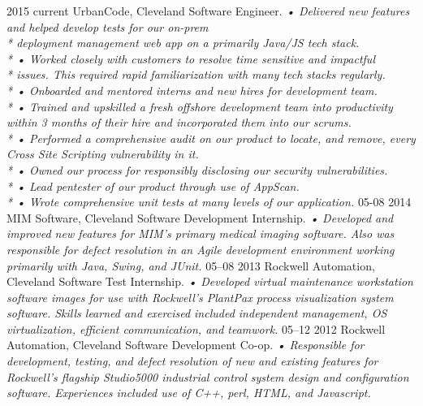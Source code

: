 \documentclass[]{friggeri-cv}
\begin{document}
\begin{entrylist}
  \entry
    {2015 current}
    {UrbanCode, Cleveland}
    {Software Engineer.}
    {\emph{
    •	Delivered new features and helped develop tests for our on-prem \\* deployment management web app on a primarily Java/JS tech stack.\\*
    •	Worked closely with customers to resolve time sensitive and impactful\\* issues. This required rapid familiarization with many tech stacks regularly.\\*
    •	Onboarded and mentored interns and new hires for development team. \\*
    •	Trained and upskilled a fresh offshore development team into productivity within 3 months of their hire and incorporated them into our scrums. \\*
    •	Performed a comprehensive audit on our product to locate, and remove, every Cross Site Scripting vulnerability in it.\\*
    •	Owned our process for responsibly disclosing our security vulnerabilities.\\*
    •	Lead pentester of our product through use of AppScan. \\*
    •	Wrote comprehensive unit tests at many levels of our application.
}}
  \entry
    {05-08 2014}
    {MIM Software, Cleveland}
    {Software Development Internship.}
    {\emph{
    •	Developed and improved new features for MIM's primary medical imaging software. Also was responsible for defect resolution in an Agile development environment working primarily with Java, Swing, and JUnit.}}
  \entry
    {05–08 2013}
    {Rockwell Automation, Cleveland}
    {Software Test Internship.}
    {\emph{
    •	Developed virtual maintenance workstation software images for use with Rockwell’s PlantPax process visualization system software. Skills learned and exercised included independent management, OS virtualization, efficient communication, and teamwork.}}
  \entry
    {05–12 2012}
    {Rockwell Automation, Cleveland}
    {Software Development Co-op.}
    {\emph{
    •	Responsible for development, testing, and defect resolution of new and existing features for Rockwell’s flagship Studio5000 industrial control system design and configuration software.  Experiences included use of C++, perl, HTML, and Javascript.}}
\end{entrylist}
\end{document}
